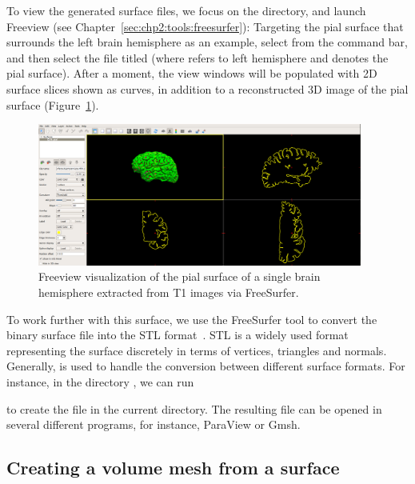 %
%
To view the generated surface files, we focus on the 
directory, and launch Freeview (see
Chapter~\ref{sec:chp2:tools:freesurfer}):
\noindent Targeting the pial surface that surrounds the left brain
hemisphere as an example, select 
from the command bar, and then select the file titled 
(where  refers to left hemisphere and  denotes the pial
surface). After a moment, the view windows will be populated with 2D
surface slices shown as curves, in addition to a reconstructed 3D
image of the pial surface (Figure~\ref{fig:chp3:freeview-scr}).
\begin{figure}%
  \centering
  \includegraphics[width=0.95\textwidth]{./graphics/chp3/freeviewexscr}
  \caption{Freeview visualization of the pial surface of a single
    brain hemisphere extracted from T1 images via FreeSurfer.}
  \label{fig:chp3:freeview-scr}
\end{figure}

%
%
To work further with this surface, we use the FreeSurfer tool
 to convert the binary surface file into the STL
format~\cite{roscoe1988stereolithography}. STL is a widely used format
representing the surface discretely in terms of vertices, triangles
and normals. Generally,  is used to handle the
conversion between different surface formats. For instance, in the
directory , we can run


\noindent to create the file  in the current
directory. The resulting file can be opened in several different
programs, for instance, ParaView or Gmsh.

\subsection{Creating a volume mesh from a surface}
\label{subsec:chp3:mesh-creation}

